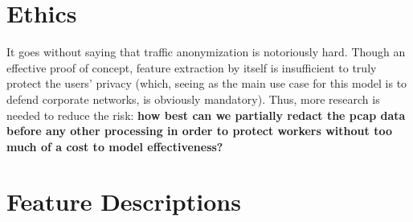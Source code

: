 \section{Ethics}

It goes without saying that traffic anonymization is notoriously hard. Though an effective proof of concept, feature extraction by itself is insufficient to truly protect the users' privacy (which, seeing as the main use case for this model is to defend corporate networks, is obviously mandatory). Thus, more research is needed to reduce the risk: \textbf{how best can we partially redact the pcap data before any other processing in order to protect workers without too much of a cost to model effectiveness?}

\section{Feature Descriptions}
\label{appsec:data_description}
